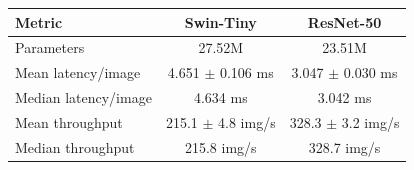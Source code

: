 \begin{tabular}{lcc}
\toprule
Metric & Swin-Tiny & ResNet-50\\
\midrule
Parameters & 27.52M & 23.51M\\
Mean latency/image & 4.651 $\pm$ 0.106 ms & 3.047 $\pm$ 0.030 ms\\
Median latency/image & 4.634 ms & 3.042 ms\\
Mean throughput & 215.1 $\pm$ 4.8 img/s & 328.3 $\pm$ 3.2 img/s\\
Median throughput & 215.8 img/s & 328.7 img/s\\
\bottomrule
\end{tabular}